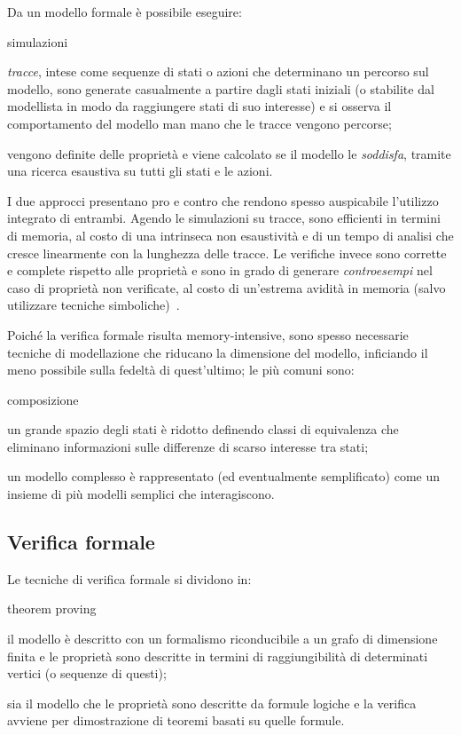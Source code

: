 		Da un modello formale \`e possibile eseguire:
		\begin{labeling}{simulazioni}
			\item [simulazioni] \emph{tracce}, intese come sequenze di stati o azioni che determinano un percorso sul modello, sono generate casualmente a partire dagli stati iniziali (o stabilite dal modellista in modo da raggiungere stati di suo interesse) e si osserva il comportamento del modello man mano che le tracce vengono percorse;
			\item [verifiche] vengono definite delle propriet\`a e viene calcolato se il modello le \emph{soddisfa}, tramite una ricerca esaustiva su tutti gli stati e le azioni.
		\end{labeling}
		
		I due approcci presentano pro e contro che rendono spesso auspicabile l'utilizzo integrato di entrambi.
		Agendo le simulazioni su tracce, sono efficienti in termini di memoria, al costo di una intrinseca non esaustivit\`a e di un tempo di analisi che cresce linearmente con la lunghezza delle tracce.
		Le verifiche invece sono corrette e complete rispetto alle propriet\`a e sono in grado di generare \emph{controesempi} nel caso di propriet\`a non verificate, al costo di un'estrema avidit\`a in memoria (salvo utilizzare tecniche simboliche)~\cite{simvsver}.
		
		Poich\'e la verifica formale risulta memory-intensive, sono spesso necessarie tecniche di modellazione che riducano la dimensione del modello, inficiando il meno possibile sulla fedelt\`a di quest'ultimo; le pi\`u comuni sono:
		\begin{labeling}{composizione}
			\item [astrazione] un grande spazio degli stati \`e ridotto definendo classi di equivalenza che eliminano informazioni sulle differenze di scarso interesse tra stati;
			\item [composizione] un modello complesso \`e rappresentato (ed eventualmente semplificato) come un insieme di pi\`u modelli semplici che interagiscono.
		\end{labeling}
		
		\subsection{Verifica formale}
		
		Le tecniche di verifica formale si dividono in:
		\begin{labeling}{theorem proving}
			\item [model checking] il modello \`e descritto con un formalismo riconducibile a un grafo di dimensione finita e le propriet\`a sono descritte in termini di raggiungibilit\`a di determinati vertici (o sequenze di questi);
			\item [theorem proving] sia il modello che le propriet\`a sono descritte da formule logiche e la verifica avviene per dimostrazione di teoremi basati su quelle formule.
		\end{labeling}
		
